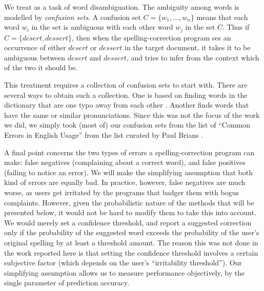 
We treat \textit{\projectTitle{}} as a task of word disambiguation. The
ambiguity among words is modelled by \textit{confusion sets}. A confusion set
\(C = \{w_1, ..., w_n\}\) means that each word \(w_i\) in the set is ambiguous
with each other word \(w_j\) in the set \(C\). Thus if \(C = \{desert,
dessert\}\), then when the spelling-correction program ses an occurrence of
either \(desert\) or \(dessert\) in the target document, it takes it to be
ambiguous between \(desert\) and \(dessert\), and tries to infer from the
context which of the two it should be.

This treatment requires a collection of confusion sets to start with. There are
several ways to obtain such a collection. One is based on finding words in the
dictionary that are one typo away from each other \cite{Mays1991517}. Another finds
words that have the same or similar pronunciations. Since this was not the
focus of the work we did, we simply took (most of) our confusion sets from the
list of ``Common Errors in English Usage'' from the list curated by Paul Brians
\cite{website:paulbrians}.

A final point concerns the two types of errors a spelling-correction program
can make: false negatives (complaining about a correct word), and false
positives (failing to notice an error). We will make the simplifying assumption
that both kind of errors are equally bad. In practice, however, false negatives
are much worse, as users get irritated by the programs that badger them with
bogus complaints. However, given the probabilistic nature of the methods that
will be presented below, it would not be hard to modify them to take this into
account. We would merely set a confidence threshold, and report a suggested
correction only if the probability of the suggested word exceeds the
probability of the user's original spelling by at least a threshold amount. The
reason this was not done in the work reported here is that setting the
confidence threshold involves a certain subjective factor (which depends on the
user's ``irritability threshold''). Our simplifying assumption allows us to
measure performance objectively, by the single parameter of prediction
accuracy.
